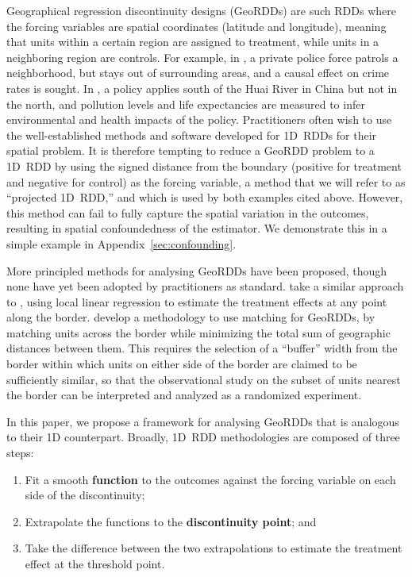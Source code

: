 \documentclass[letter]{article}
\providecommand{\tightlist}{%
      \setlength{\itemsep}{0pt}\setlength{\parskip}{0pt}}
\providecommand{\tightlist}{%
  	  \setlength{\itemsep}{0pt}\setlength{\parskip}{0pt}}
\renewcommand{\cite}[1]{\citet{#1}}
\begin{document}
    	Geographical regression discontinuity designs (GeoRDDs) are such RDDs where the forcing variables are spatial coordinates (latitude and longitude),
meaning that units within a certain region are assigned to treatment, while units in a neighboring region are controls.
For example, in \cite{macdonald2015effect}, a private police force patrols a neighborhood, but stays out of surrounding areas, and a causal effect on crime rates is sought.
In \cite{chen2013evidence}, a policy applies south of the Huai River in China but not in the north, and pollution levels and life expectancies are measured to infer environmental and health impacts of the policy.
Practitioners often wish to use the well-established methods and software developed for 1D~RDDs for their spatial problem.
It is therefore tempting to reduce a GeoRDD problem to a 1D~RDD by using the signed distance from the boundary (positive for treatment and negative for control) as the forcing variable, a method that we will refer to as ``projected 1D~RDD,'' and which is used by both examples cited above.
However, this method can fail to fully capture the spatial variation in the outcomes, resulting in spatial confoundedness of the estimator.
We demonstrate this in a simple example in Appendix~\ref{sec:confounding}.
    


    	More principled methods for analysing GeoRDDs have been proposed, though none have yet been adopted by practitioners as standard.
\cite{keeleoverview} take a similar approach to \cite{imbens2011regression}, using local linear regression to estimate the treatment effects at any point along the border.
\cite{keele2015enhancing} develop a methodology to use matching for GeoRDDs, by matching units across the border while minimizing the total sum of geographic distances between them.
This requires the selection of a ``buffer'' width from the border within which units on either side of the border are claimed to be sufficiently similar, so that the observational study on the subset of units nearest the border can be interpreted and analyzed as a randomized experiment.
    


    	\label{sec:framework}
    


    	In this paper, we propose a framework for analysing GeoRDDs that is analogous to their 1D counterpart.
Broadly, 1D~RDD methodologies are composed of three steps:

\begin{enumerate}
\def\labelenumi{\arabic{enumi}.}
\tightlist
\item
  Fit a smooth \textbf{function} to the outcomes against the forcing variable on each side of the discontinuity;
\item
  Extrapolate the functions to the \textbf{discontinuity point}; and
\item
  Take the difference between the two extrapolations to estimate the treatment effect at the threshold point.
\end{enumerate}
\end{document}
